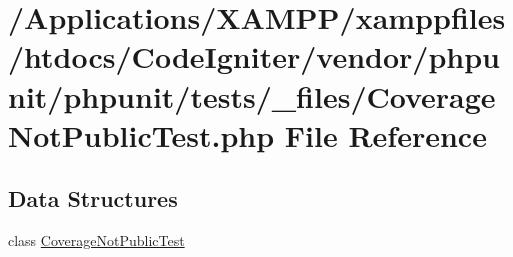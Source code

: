 \hypertarget{phpunit_2tests_2__files_2_coverage_not_public_test_8php}{}\section{/\+Applications/\+X\+A\+M\+P\+P/xamppfiles/htdocs/\+Code\+Igniter/vendor/phpunit/phpunit/tests/\+\_\+files/\+Coverage\+Not\+Public\+Test.php File Reference}
\label{phpunit_2tests_2__files_2_coverage_not_public_test_8php}
\subsection*{Data Structures}
\begin{DoxyCompactItemize}
\item 
class \mbox{\hyperlink{class_coverage_not_public_test}{Coverage\+Not\+Public\+Test}}
\end{DoxyCompactItemize}
